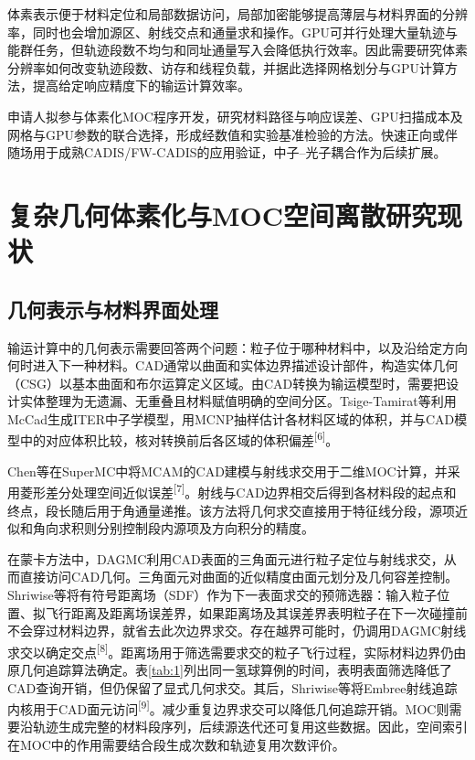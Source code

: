 \documentclass[UTF8, zihao=-4, fontset=none, a4paper]{ctexart}
\newcommand{\upcite}[1]{\textsuperscript{[#1]}}
\begin{document}
体素表示便于材料定位和局部数据访问，局部加密能够提高薄层与材料界面的分辨率，同时也会增加源区、射线交点和通量求和操作。GPU可并行处理大量轨迹与能群任务，但轨迹段数不均匀和同址通量写入会降低执行效率。因此需要研究体素分辨率如何改变轨迹段数、访存和线程负载，并据此选择网格划分与GPU计算方法，提高给定响应精度下的输运计算效率。

申请人拟参与体素化MOC程序开发，研究材料路径与响应误差、GPU扫描成本及网格与GPU参数的联合选择，形成经数值和实验基准检验的方法。快速正向或伴随场用于成熟CADIS/FW-CADIS的应用验证，中子--光子耦合作为后续扩展。

\section{复杂几何体素化与MOC空间离散研究现状}\label{sec:2}

\subsection{几何表示与材料界面处理}

输运计算中的几何表示需要回答两个问题：粒子位于哪种材料中，以及沿给定方向何时进入下一种材料。CAD通常以曲面和实体边界描述设计部件，构造实体几何（CSG）以基本曲面和布尔运算定义区域。由CAD转换为输运模型时，需要把设计实体整理为无遗漏、无重叠且材料赋值明确的空间分区。Tsige-Tamirat等利用McCad生成ITER中子学模型，用MCNP抽样估计各材料区域的体积，并与CAD模型中的对应体积比较，核对转换前后各区域的体积偏差\upcite{6}。

Chen等在SuperMC中将MCAM的CAD建模与射线求交用于二维MOC计算，并采用菱形差分处理空间近似误差\upcite{7}。射线与CAD边界相交后得到各材料段的起点和终点，段长随后用于角通量递推。该方法将几何求交直接用于特征线分段，源项近似和角向求积则分别控制段内源项及方向积分的精度。

在蒙卡方法中，DAGMC利用CAD表面的三角面元进行粒子定位与射线求交，从而直接访问CAD几何。三角面元对曲面的近似精度由面元划分及几何容差控制。Shriwise等将有符号距离场（SDF）作为下一表面求交的预筛选器：输入粒子位置、拟飞行距离及距离场误差界，如果距离场及其误差界表明粒子在下一次碰撞前不会穿过材料边界，就省去此次边界求交。存在越界可能时，仍调用DAGMC射线求交以确定交点\upcite{8}。距离场用于筛选需要求交的粒子飞行过程，实际材料边界仍由原几何追踪算法确定。表\ref{tab:1}列出同一氢球算例的时间，表明表面筛选降低了CAD查询开销，但仍保留了显式几何求交。其后，Shriwise等将Embree射线追踪内核用于CAD面元访问\upcite{9}。减少重复边界求交可以降低几何追踪开销。MOC则需要沿轨迹生成完整的材料段序列，后续源迭代还可复用这些数据。因此，空间索引在MOC中的作用需要结合段生成次数和轨迹复用次数评价。
\end{document}

